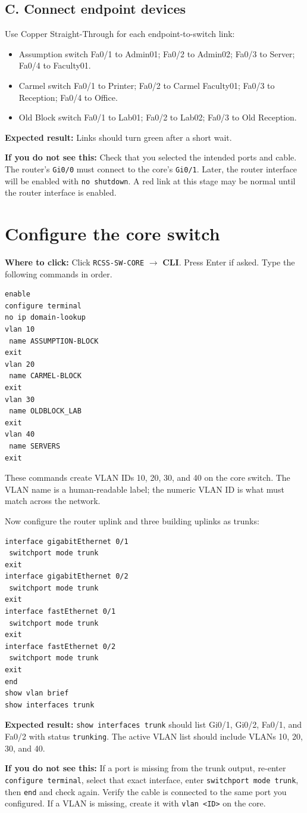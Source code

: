 \documentclass[11pt,a4paper]{article}
\newcommand{\clickpath}[1]{\noindent\colorbox{noteBG}{\parbox{0.96\linewidth}{\textbf{Where to click:} #1}}\par\vspace{5pt}}
\newcommand{\expected}[1]{\noindent\colorbox{noteBG}{\parbox{0.96\linewidth}{\textbf{Expected result:} #1}}\par\vspace{5pt}}
\newcommand{\ifnot}[1]{\noindent\colorbox{warnBG}{\parbox{0.96\linewidth}{\textbf{If you do not see this:} #1}}\par\vspace{5pt}}
\begin{document}
\subsection*{C. Connect endpoint devices}
Use Copper Straight-Through for each endpoint-to-switch link:
\begin{itemize}
\item Assumption switch Fa0/1 to Admin01; Fa0/2 to Admin02; Fa0/3 to Server; Fa0/4 to Faculty01.
\item Carmel switch Fa0/1 to Printer; Fa0/2 to Carmel Faculty01; Fa0/3 to Reception; Fa0/4 to Office.
\item Old Block switch Fa0/1 to Lab01; Fa0/2 to Lab02; Fa0/3 to Old Reception.
\end{itemize}

\expected{Links should turn green after a short wait.}
\ifnot{Check that you selected the intended ports and cable. The router's \texttt{Gi0/0} must connect to the core's \texttt{Gi0/1}. Later, the router interface will be enabled with \texttt{no shutdown}. A red link at this stage may be normal until the router interface is enabled.}

\section{Configure the core switch}\label{sec:core}
\clickpath{Click \texttt{RCSS-SW-CORE} \(\rightarrow\) \textbf{CLI}. Press Enter if asked. Type the following commands in order.}
\begin{lstlisting}
enable
configure terminal
no ip domain-lookup
vlan 10
 name ASSUMPTION-BLOCK
exit
vlan 20
 name CARMEL-BLOCK
exit
vlan 30
 name OLDBLOCK_LAB
exit
vlan 40
 name SERVERS
exit
\end{lstlisting}
These commands create VLAN IDs 10, 20, 30, and 40 on the core switch. The VLAN name is a human-readable label; the numeric VLAN ID is what must match across the network.

Now configure the router uplink and three building uplinks as trunks:
\begin{lstlisting}
interface gigabitEthernet 0/1
 switchport mode trunk
exit
interface gigabitEthernet 0/2
 switchport mode trunk
exit
interface fastEthernet 0/1
 switchport mode trunk
exit
interface fastEthernet 0/2
 switchport mode trunk
exit
end
show vlan brief
show interfaces trunk
\end{lstlisting}
\expected{\texttt{show interfaces trunk} should list Gi0/1, Gi0/2, Fa0/1, and Fa0/2 with status \texttt{trunking}. The active VLAN list should include VLANs 10, 20, 30, and 40.}
\ifnot{If a port is missing from the trunk output, re-enter \texttt{configure terminal}, select that exact interface, enter \texttt{switchport mode trunk}, then \texttt{end} and check again. Verify the cable is connected to the same port you configured. If a VLAN is missing, create it with \texttt{vlan <ID>} on the core.}
\end{document}
